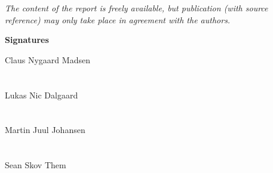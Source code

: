 \vfill

{\footnotesize\itshape The content of the report is freely available, but publication (with source reference) may only take place in agreement with the authors.}

\pagebreak
\thispagestyle{empty}

\textbf{Signatures}

Claus Nygaard Madsen\\\\
\makebox[3in]{\hrulefill}\\

Lukas Nic Dalgaard\\\\
\makebox[3in]{\hrulefill}\\

Martin Juul Johansen\\\\
\makebox[3in]{\hrulefill}\\

Sean Skov Them \\\\
\makebox[3in]{\hrulefill}\\